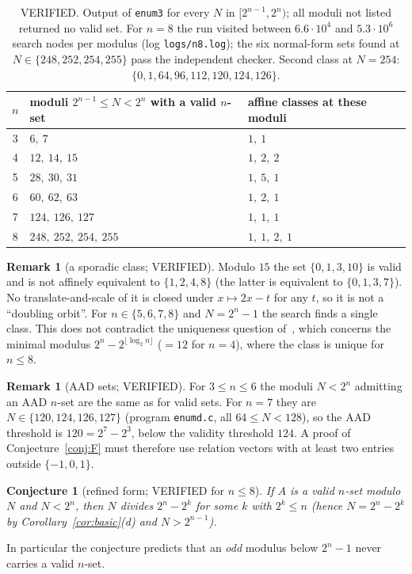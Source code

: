 \documentclass[11pt]{article}
\newtheorem{conjecture}[theorem]{Conjecture}
\theoremstyle{definition}
\newtheorem{remark}[theorem]{Remark}
\begin{document}
\begin{table}[h]\centering
\begin{tabular}{cll}
\toprule
$n$ & moduli $2^{n-1}\le N<2^n$ with a valid $n$-set & affine classes at these moduli\\
\midrule
3 & $6,\ 7$ & $1,\ 1$\\
4 & $12,\ 14,\ 15$ & $1,\ 2,\ 2$\\
5 & $28,\ 30,\ 31$ & $1,\ 5,\ 1$\\
6 & $60,\ 62,\ 63$ & $1,\ 2,\ 1$\\
7 & $124,\ 126,\ 127$ & $1,\ 1,\ 1$\\
8 & $248,\ 252,\ 254,\ 255$ & $1,\ 1,\ 2,\ 1$\\
\bottomrule
\end{tabular}
\caption{VERIFIED. Output of \texttt{enum3} for every $N$ in $[2^{n-1},2^n)$; all moduli not listed returned no valid set. For $n=8$ the run visited between $6.6\cdot10^4$ and $5.3\cdot10^6$ search nodes per modulus (log \texttt{logs/n8.log}); the six normal-form sets found at $N\in\{248,252,254,255\}$ pass the independent checker. Second class at $N=254$: $\{0,1,64,96,112,120,124,126\}$.}\label{tab:valid}
\end{table}


\begin{remark}[a sporadic class; VERIFIED]
Modulo $15$ the set $\{0,1,3,10\}$ is valid and is not affinely equivalent to $\{1,2,4,8\}$ (the latter is equivalent to $\{0,1,3,7\}$). No translate-and-scale of it is closed under $x\mapsto 2x-t$ for any $t$, so it is not a ``doubling orbit''. For $n\in\{5,6,7,8\}$ and $N=2^n-1$ the search finds a single class. This does not contradict the uniqueness question of~\cite{F}, which concerns the minimal modulus $2^n-2^{\lfloor\log_2 n\rfloor}$ ($=12$ for $n=4$), where the class is unique for $n\le 8$.
\end{remark}
\begin{remark}[AAD sets; VERIFIED]
For $3\le n\le 6$ the moduli $N<2^n$ admitting an AAD $n$-set are the same as for valid sets. For $n=7$ they are $N\in\{120,124,126,127\}$ (program \texttt{enumd.c}, all $64\le N<128$), so the AAD threshold is $120=2^7-2^3$, below the validity threshold $124$. A proof of Conjecture~\ref{conj:F} must therefore use relation vectors with at least two entries outside $\{-1,0,1\}$.
\end{remark}
\begin{conjecture}[refined form; VERIFIED for $n\le 8$]\label{conj:refined}
If $A$ is a valid $n$-set modulo $N$ and $N<2^n$, then $N$ divides $2^n-2^k$ for some $k$ with $2^k\le n$ (hence $N=2^n-2^k$ by Corollary~\ref{cor:basic}(d) and $N>2^{n-1}$).
\end{conjecture}
In particular the conjecture predicts that an \emph{odd} modulus below $2^n-1$ never carries a valid $n$-set.
\end{document}
